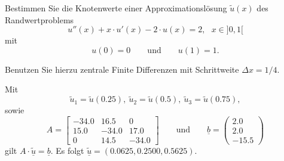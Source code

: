 Bestimmen Sie die Knotenwerte einer Approximationslösung
$\tilde u(x)$ des Randwertproblems
\[
u''(x) + x \cdot u'(x) - 2 \cdot u(x) = 2, \ \ \ x \in ]0,1[
\]
mit
\[
u(0) = 0
\qquad
\text{und}
\qquad
u(1) = 1.
\]

Benutzen Sie hierzu zentrale Finite Differenzen mit Schrittweite
$\Delta x = 1/4$. 


\begin{loesung}
Mit 
\[
\tilde u_1
=
\tilde u(0.25), \ \tilde u_2 = \tilde u(0.5), \ \tilde u_3 = \tilde u(0.75),
\]
sowie 
\[
A = \left[\begin{array}{rrr} 
-34.0 & 16.5 & 0 \\
15.0 & -34.0 & 17.0 \\
0 & 14.5 & -34.0 \end{array}\right]
\qquad
\text{und}
\qquad
\underline{b} =  \left(\begin{array}{r} 2.0 \\ 2.0 \\ -15.5 \end{array}\right) 
\]
gilt
$A \cdot \underline{\tilde u} = \underline{b}$.
Es folgt $\underline{\tilde u} = (0.0625, 0.2500, 0.5625).$
\end{loesung}



